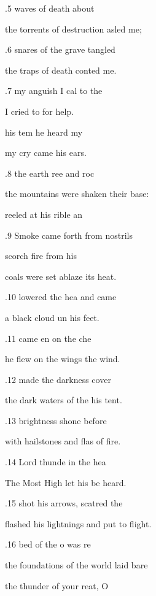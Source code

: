 .5  waves of death  about  

the torrents of destruction asled me; 

.6  snares of the grave tangled  

the traps of death conted me. 

.7  my anguish I cal to the  

I cried to  for help. 

 his tem he heard my  

my cry came  his ears. 

.8  the earth ree and roc 

the mountains were shaken  their base: 

 reeled at his rible an 

.9 Smoke came forth from  nostrils 

 scorch fire from his  

coals were set ablaze  its heat. 

.10  lowered the hea and came  

a black cloud un his feet. 

.11  came en on the che 

he flew on the wings  the wind. 

.12  made the darkness  cover 

the dark waters of the  his tent. 

.13  brightness shone  before  

with hailstones and flas of fire. 

.14  Lord thunde in the hea 

The Most High let his  be heard. 

.15  shot his arrows, scatred the  

flashed his lightnings and put  to flight. 

.16  bed of the o was re 

the foundations of the world  laid bare 

 the thunder of your reat, O  

